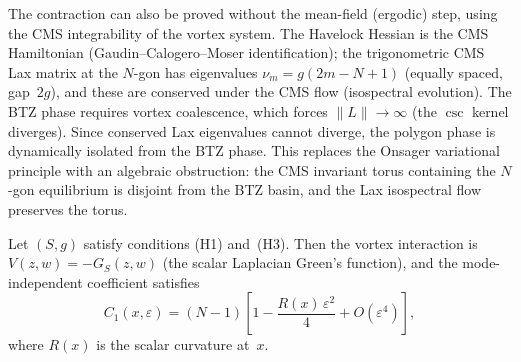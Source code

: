 \begin{remark}
\label{rmk:lax-conservation}
The contraction can also be proved without the mean-field
(ergodic) step, using the CMS integrability of the
vortex system.
The Havelock Hessian is the CMS Hamiltonian
(Gaudin--Calogero--Moser identification); the
trigonometric CMS Lax matrix at the $N$-gon has
eigenvalues $\nu_m = g(2m{-}N{+}1)$ (equally spaced,
gap~$2g$), and these are conserved under the
CMS flow (isospectral evolution).
The BTZ phase requires vortex coalescence, which
forces $\|L\| \to \infty$ (the $\csc$ kernel diverges).
Since conserved Lax eigenvalues cannot diverge,
the polygon phase is dynamically isolated from the
BTZ phase.
This replaces the Onsager variational principle with
an algebraic obstruction: the CMS invariant torus
containing the $N$-gon equilibrium is disjoint from
the BTZ basin, and the Lax isospectral flow preserves
the torus.
\end{remark}

\begin{lemma}
\label{lem:log-interaction}
Let $(S, g)$ satisfy conditions \textup{(H1)} and~\textup{(H3)}.
Then the vortex interaction is $V(z,w) = -G_S(z,w)$
(the scalar Laplacian Green's function), and the
mode-independent coefficient satisfies
\begin{equation}\label{eq:C1-expansion-proof}
  C_1(x, \varepsilon)
  = (N{-}1)\!\left[1 - \frac{R(x)\,\varepsilon^2}{4}
    + O(\varepsilon^4)\right],
\end{equation}
where $R(x)$ is the scalar curvature at~$x$.
\end{lemma}

